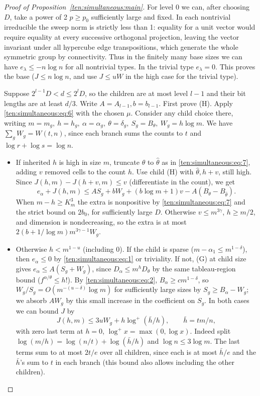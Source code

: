 \begin{proof}[Proof of Proposition~\ref{ten:simultaneous:main}]
For level 0 we can, after choosing \(D\), take a power of 2 \(p\ge p_0\) sufficiently large and fixed. In each nontrivial irreducible the sweep norm is strictly less than 1: equality for a unit vector would require equality at every successive orthogonal projection, leaving the vector invariant under all hypercube edge transpositions, which generate the whole symmetric group by connectivity. Thus in the finitely many base sizes we can have \(e_\lambda\le -n\log n\) for all nontrivial types. In the trivial type \(e_\lambda=0\). This proves the base (\(J\le n\log n\), and use \(J\le uW\) in the high case for the trivial type).

Suppose \(2^{l-1}D<d\le 2^l D\), so the children are at most level \(l-1\) and their bit lengths are at least \(d/3\). Write \(A=A_{l-1}, b=b_{l-1}\). First prove (H). Apply \eqref{ten:simultaneous:eq:6} with the chosen \(\mu\). Consider any child choice there, writing \(m=m_g,\ h=h_g,\ \alpha=\alpha_g,\ \theta=\delta_g,\ S_g=B_\theta,\ W_g=h\log m\). We have \(\sum_g W_g=W(t,n)\), since each branch sums the counts to \(t\) and \(\log r+\log s=\log n\).

\begin{itemize}
\item If inherited \(h\) is high in size \(m\), truncate \(\theta\) to \(\widehat\theta\) as in \eqref{ten:simultaneous:eq:7}, adding \(v\) removed cells to the count \(h\). Use child (H) with \(\widehat\theta,h+v\), still high. Since \(J(h,m)-J(h+v,m)\le v\) (differentiate in the count), we get
\[
 e_\alpha+J(h,m)
 \le A S_g+b W_g+(b\log m+1)v-A(B_\theta-B_{\widehat\theta}).
\]
When \(m-h\ge K_m^3\) the extra is nonpositive by \eqref{ten:simultaneous:eq:7} and the strict bound on \(2b_0\), for sufficiently large \(D\). Otherwise \(v\le m^{3\gamma}\), \(h\ge m/2\), and dimension is nondecreasing, so the extra is at most \(2(b+1/\log m)m^{3\gamma-1}W_g\).
\end{itemize}

\begin{itemize}
\item Otherwise \(h<m^{1-u}\) (including \(0\)). If the child is sparse (\(m-\alpha_1\le m^{1-\delta}\)), then \(e_\alpha\le0\) by \eqref{ten:simultaneous:eq:1} or triviality. If not, (G) at child size gives \(e_\alpha\le A(S_g+W_g)\), since \(D_\alpha\le m^h D_\theta\) by the same tableau-region bound (\(f^{\alpha/\theta}\le h!\)). By \eqref{ten:simultaneous:eq:2}, \(B_\alpha\ge c m^{1-\delta}\), so \(W_g/S_g=O(m^{-(u-\delta)}\log m)\) for sufficiently large sizes by \(S_g\ge B_\alpha-W_g\); we absorb \(A W_g\) by this small increase in the coefficient on \(S_g\). In both cases we can bound \(J\) by
\[
 J(h,m)\le 3u W_g + h\log^+(\bar h/h),\qquad \bar h=tm/n,
\]
with zero last term at \(h=0\), \(\log^+ x=\max(0,\log x)\). Indeed split \(\log(m/h)=\log(n/t)+\log(\bar h/h)\) and \(\log n\le3\log m\). The last terms sum to at most \(2t/e\) over all children, since each is at most \(\bar h/e\) and the \(\bar h\)'s sum to \(t\) in each branch (this bound also allows including the other children).
\end{itemize}


\end{proof}
